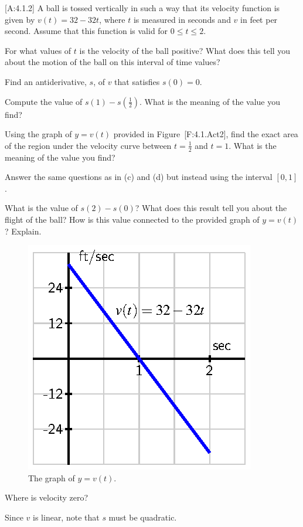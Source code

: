 {[}A:4.1.2{]} A ball is tossed vertically in such a way that its
velocity function is given by \(v(t) = 32 - 32t\), where \(t\) is
measured in seconds and \(v\) in feet per second. Assume that this
function is valid for \(0 \le t \le 2\).

For what values of \(t\) is the velocity of the ball positive? What does
this tell you about the motion of the ball on this interval of time
values?

Find an antiderivative, \(s\), of \(v\) that satisfies \(s(0) = 0\).

Compute the value of \(s(1) - s(\frac{1}{2})\). What is the meaning of
the value you find?

Using the graph of \(y = v(t)\) provided in Figure~{[}F:4.1.Act2{]},
find the exact area of the region under the velocity curve between
\(t = \frac{1}{2}\) and \(t = 1\). What is the meaning of the value you
find?

Answer the same questions as in (c) and (d) but instead using the
interval \([0,1]\).

What is the value of \(s(2) - s(0)\)? What does this result tell you
about the flight of the ball? How is this value connected to the
provided graph of \(y = v(t)\)? Explain.

\begin{figure}[htbp]
\centering
\includegraphics{figures/4_1_Act2.eps}
\caption{The graph of \(y = v(t)\).{}}
\end{figure}

Where is velocity zero?

Since \(v\) is linear, note that \(s\) must be quadratic.

